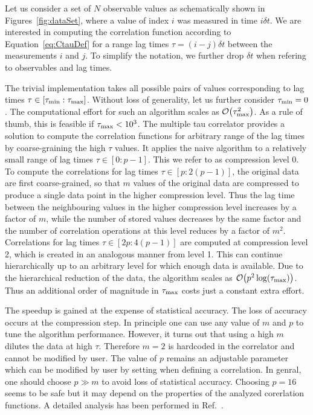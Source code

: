 Let us consider a set of $N$ observable values as schematically shown
in Figures~\ref{fig:dataSet}, where a value of index $i$ was measured
in time $i\delta t$. We are interested in computing the correlation 
function according to Equation~\ref{eq:CtauDef} for a range lag times
$\tau = (i-j)\delta t$ between the measurements $i$ and $j$.
To simplify the notation, we further drop $\delta t$
when refering to observables and lag times. 

The trivial implementation takes all possible pairs of values
corresponding to lag times $\tau \in [\taumin:\taumax]$. 
Without loss of generality, let us further consider $\taumin=0$.
The computational effort for such an algorithm scales
as ${\cal O} \bigl(\taumax^2\bigr)$.
As a rule of thumb, this is feasible if $\taumax < 10^3$.
The multiple tau correlator provides a solution to compute the
correlation functions for arbitrary range of the lag times by
coarse-graining the high $\tau$ values. It applies the naive algorithm
to a relatively small range of lag times $\tau \in [0:p-1]$. This we refer
to as compression level 0. To compute the correlations for lag times
$\tau \in [p:2(p-1)]$, the original data are first coarse-grained, so
that $m$ values of the original data are compressed to produce a single
data point in the higher compression level. Thus the lag time between
the neighbouring values in the higher compression level increases
by a factor of $m$, while the number of stored values decreases by
the same factor and the number of correlation operations at this level
reduces by a factor of $m^2$. Correlations for lag times 
$\tau \in [2p:4(p-1)]$ are computed at compression level 2, which is created
in an analogous manner from level 1. This can continue hierarchically
up to an arbitrary level for which enough data is available. Due to the
hierarchical reduction of the data, the algorithm scales as 
${\cal O} \bigl( p^2 \log(\taumax) \bigr)$. Thus an additional order
of magnitude in $\taumax$ costs just a constant extra effort.

The speedup is gained at the expense of statistical accuracy.
The loss of accuracy occurs at the compression step.
In principle one can use any value of $m$ and $p$ to tune the algorithm
performance. However, it turns out that using a high $m$ dilutes the
data at high $\tau$. Therefore $m=2$ is hardcoded in the \es correlator
and cannot be modified by user. The value of $p$ remains an adjustable
parameter which can be modified by user by setting 
when defining a correlation. In genral, one should choose $p \gg m$
to avoid loss of statistical accuracy. Choosing $p=16$ seems to be
safe but it may depend on the properties of the analyzed
corerlation functions. A detailed analysis has been performed
in Ref.~\cite{ramirez10a}.

